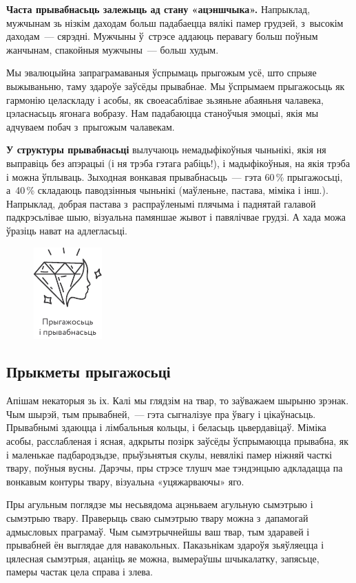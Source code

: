 \textbf{Часта прывабнасьць залежыць ад стану «ацэншчыка».} Напрыклад, мужчынам зь нізкім даходам больш падабаецца вялікі памер грудзей, з~высокім даходам~--- сярэдні. Мужчыны ў~стрэсе аддаюць перавагу больш поўным жанчынам, спакойныя мужчыны~--- больш худым.

Мы эвалюцыйна запраграмаваныя ўспрымаць прыгожым усё, што спрыяе выжываньню, таму здароўе заўсёды прывабнае. Мы ўспрымаем прыгажосьць як гармонію целаскладу і асобы, як своеасаблівае зьзяньне абаяньня чалавека, цэласнасьць ягонага вобразу. Нам падабаюцца станоўчыя эмоцыі, якія мы адчуваем побач з~прыгожым чалавекам.

\textbf{У структуры прывабнасьці} вылучаюць немадыфікоўныя чыньнікі, якія ня выправіць без апэрацыі (і ня трэба гэтага рабіць!), і мадыфікоўныя, на якія трэба і можна ўплываць. Зыходная вонкавая прывабнасьць~--- гэта 60\,\% прыгажосьці, а~40\,\% складаюць паводзінныя чыньнікі (маўленьне, пастава, міміка і інш.). Напрыклад, добрая пастава з~распраўленымі плячыма і паднятай галавой падкрэсьлівае шыю, візуальна памяншае жывот і павялічвае грудзі. А хада можа ўразіць нават на адлегласьці.

\begin{figure}[htb!]
  \centering
  \includegraphics[scale=1.5]{willpower/ch9/5.pdf}
\end{figure}

\subsection*{Прыкметы прыгажосьці}

Апішам некаторыя зь іх. Калі мы глядзім на твар, то заўважаем шырыню зрэнак. Чым шырэй, тым прывабней,~--- гэта сыгналізуе пра ўвагу і цікаўнасьць. Прывабнымі здаюцца і лімбальныя кольцы, і беласьць цьвердавіцаў. Міміка асобы, расслабленая і ясная, адкрыты позірк заўсёды ўспрымаюцца прывабна, як і маленькае падбародзьдзе, прыўзьнятыя скулы, невялікі памер ніжняй часткі твару, поўныя вусны. Дарэчы, пры стрэсе тлушч мае тэндэнцыю адкладацца па вонкавым контуры твару, візуальна «уцяжарваючы» яго.

Пры агульным поглядзе мы несьвядома ацэньваем агульную сымэтрыю і сымэтрыю твару. Праверыць сваю сымэтрыю твару можна з~дапамогай адмысловых праграмаў. Чым сымэтрычнейшы ваш твар, тым здаравей і прывабней ён выглядае для навакольных. Паказьнікам здароўя зьяўляецца і цялесная сымэтрыя, ацаніць яе можна, вымераўшы шчыкалатку, запясьце, памеры частак цела справа і злева.

